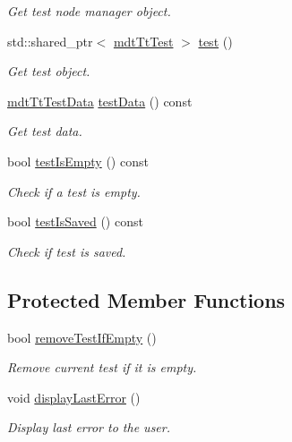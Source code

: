 \begin{DoxyCompactItemize}
\begin{DoxyCompactList}\small\item\em Get test node manager object. \end{DoxyCompactList}\item 
std\-::shared\-\_\-ptr$<$ \hyperlink{classmdt_tt_test}{mdt\-Tt\-Test} $>$ \hyperlink{classmdt_tt_abstract_tester_a096db7bd6418195ba2a372ba1bec923f}{test} ()
\begin{DoxyCompactList}\small\item\em Get test object. \end{DoxyCompactList}\item 
\hyperlink{classmdt_tt_test_data}{mdt\-Tt\-Test\-Data} \hyperlink{classmdt_tt_abstract_tester_a638dc8049de3a5e5ef6f753444800e19}{test\-Data} () const 
\begin{DoxyCompactList}\small\item\em Get test data. \end{DoxyCompactList}\item 
bool \hyperlink{classmdt_tt_abstract_tester_ac9eead60ccacb39581dd792d00a18466}{test\-Is\-Empty} () const 
\begin{DoxyCompactList}\small\item\em Check if a test is empty. \end{DoxyCompactList}\item 
bool \hyperlink{classmdt_tt_abstract_tester_af98bb9d80bfbd14873fc356c17d31eb4}{test\-Is\-Saved} () const 
\begin{DoxyCompactList}\small\item\em Check if test is saved. \end{DoxyCompactList}\end{DoxyCompactItemize}
\subsection*{Protected Member Functions}
\begin{DoxyCompactItemize}
\item 
bool \hyperlink{classmdt_tt_abstract_tester_a75396c57e71377ef9224d49ec3273209}{remove\-Test\-If\-Empty} ()
\begin{DoxyCompactList}\small\item\em Remove current test if it is empty. \end{DoxyCompactList}\item 
void \hyperlink{classmdt_tt_abstract_tester_afc2325803369ec4d4225b9584c915c83}{display\-Last\-Error} ()
\begin{DoxyCompactList}\small\item\em Display last error to the user. \end{DoxyCompactList}\end{DoxyCompactItemize}

